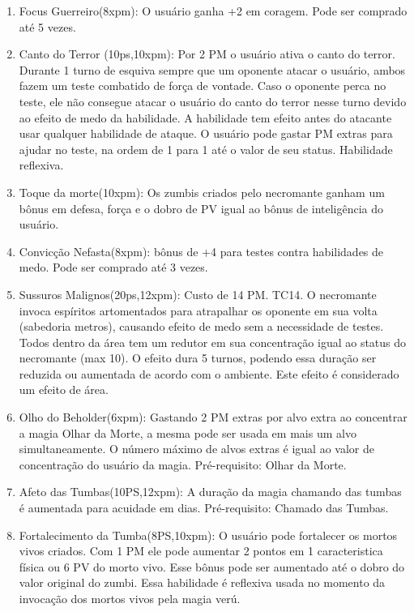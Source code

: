   
\begin{enumerate}

 	\item Focus Guerreiro(8xpm): O usuário ganha +2 em coragem. Pode ser comprado até 5 vezes.

	\item Canto do Terror (10ps,10xpm): Por 2 PM o usuário ativa o canto do terror. Durante 1 turno de esquiva sempre que um oponente atacar o usuário, ambos fazem um teste combatido de força de vontade. Caso o oponente perca no teste, ele não consegue atacar o usuário do canto do terror nesse turno devido ao efeito de medo da habilidade. A habilidade tem efeito antes do atacante usar qualquer habilidade de ataque. O usuário pode gastar PM extras para ajudar no teste, na ordem de 1 para 1 até o valor de seu status.
 Habilidade reflexiva.
			
  \item Toque da morte(10xpm): Os zumbis criados pelo necromante ganham um bônus em defesa, força e o dobro de PV igual ao bônus de inteligência do usuário. 

	\item Convicção Nefasta(8xpm): bônus de +4 para testes contra habilidades de medo. Pode ser comprado até 3 vezes.
 
  \item Sussuros Malignos(20ps,12xpm): Custo de 14 PM. TC14.\newline 
  O necromante invoca espíritos artomentados para atrapalhar os oponente em sua volta (sabedoria metros), causando efeito de medo sem a necessidade de testes. Todos dentro da área tem um redutor em sua concentração igual ao status do necromante (max 10). O efeito dura 5 turnos, podendo essa duração ser reduzida ou aumentada de acordo com o ambiente. Este efeito é considerado um efeito de área.

	\item Olho do Beholder(6xpm): Gastando 2 PM extras por alvo extra ao concentrar a magia Olhar da Morte, a mesma pode ser usada em mais um alvo simultaneamente. O número máximo de alvos extras é igual ao valor de concentração do usuário da magia. Pré-requisito: Olhar da Morte.

	\item Afeto das Tumbas(10PS,12xpm): A duração da magia chamando das tumbas é aumentada para acuidade em dias. Pré-requisito: Chamado das Tumbas. 
	
	\item Fortalecimento da Tumba(8PS,10xpm): O usuário pode fortalecer os mortos vivos criados. Com 1 PM ele pode aumentar 2 pontos em 1 caracteristica física ou 6 PV do morto vivo. Esse bônus pode ser aumentado até o dobro do valor original do zumbi. Essa habilidade é reflexiva usada no momento da invocação dos mortos vivos pela magia verú.
	

\end{enumerate}
